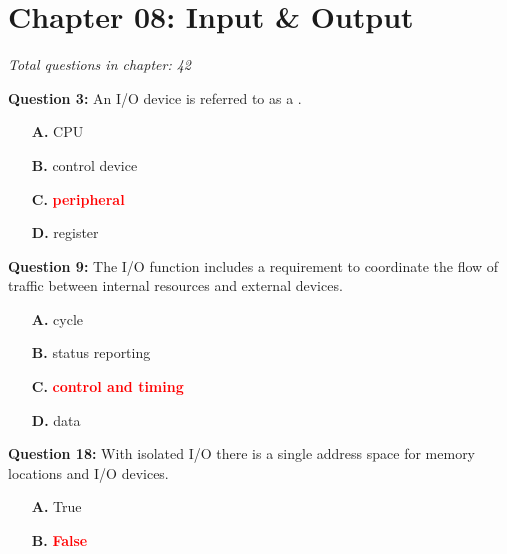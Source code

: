 \documentclass[12pt,a4paper]{article}
\begin{document}
\section{Chapter 08: Input \& Output}
\textit{Total questions in chapter: 42}

\textbf{Question 3:} An I/O device is referred to as a \underline{\hspace{1.5cm}}.

\begin{itemize}
    \item[\textbf{A.}] CPU
    \item[\textbf{B.}] control device
    \item[\textbf{C.}] \textcolor{red}{\textbf{peripheral}}
    \item[\textbf{D.}] register
\end{itemize}

\vspace{0.5cm}

\vspace{0.5cm}

\textbf{Question 9:} The I/O function includes a \underline{\hspace{1.5cm}} requirement to coordinate the flow of traffic between internal resources and external devices.

\begin{itemize}
    \item[\textbf{A.}] cycle
    \item[\textbf{B.}] status reporting
    \item[\textbf{C.}] \textcolor{red}{\textbf{control and timing}}
    \item[\textbf{D.}] data
\end{itemize}

\vspace{0.5cm}

\vspace{0.5cm}

\textbf{Question 18:} With isolated I/O there is a single address space for memory locations and I/O devices.

\begin{itemize}
    \item[\textbf{A.}] True
    \item[\textbf{B.}] \textcolor{red}{\textbf{False}}
\end{itemize}

\vspace{0.5cm}

\vspace{0.5cm}
\end{document}
